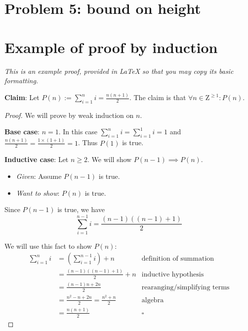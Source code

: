 \documentclass[titlepage]{article}
\begin{document}
\section{Problem 5: bound on height}

\section{Example of proof by induction}

\emph{This is an example proof, provided in LaTeX so that you may copy its basic formatting.}

\textbf{Claim}: Let $P(n) := \sum_{i=1}^n i = \frac{n(n+1)}{2}$.  The claim is that $\forall n \in \mathrm{Z}^{\geq 1}: P(n)$.

\begin{proof}
We will prove by weak induction on $n$.

\textbf{Base case}: $n=1$.  In this case $\sum_{i=1}^n i = \sum_{i=1}^1 i = 1$ and $\frac{n(n+1)}{2} = \frac{1 \times (1+1)}{2} = 1$.  Thus $P(1)$ is true.


\textbf{Inductive case}: Let $n \geq 2$.  We will show $P(n-1) \implies P(n)$.
\begin{itemize}
\item \emph{Given}: Assume $P(n-1)$ is true.
\item \emph{Want to show}: $P(n)$ is true.
\end{itemize}
Since $P(n-1)$ is true, we have
$$\sum_{i=1}^{n-1} i = \frac{(n-1)((n-1)+1)}{2}$$

We will use this fact to show $P(n)$:
\begin{align*}
\sum_{i=1}^{n} i &= \left( \sum_{i=1}^{n-1} i \right) + n & \text{definition of summation} \\
&= \frac{(n-1)((n-1)+1)}{2} + n & \text{inductive hypothesis} \\
&= \frac{(n-1)n + 2n}{2} & \text{rearanging/simplifying terms} \\
&= \frac{n^2 - n + 2n}{2} = \frac{n^2 + n}{2}  & \text{algebra} \\
&= \frac{n(n + 1)}{2}  & \square
\end{align*}
\end{proof}
\end{document}
